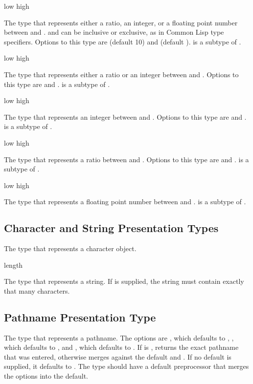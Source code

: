  {\optional low high}

The type that represents either a ratio, an integer, or a floating point number
between  and .   and  can be inclusive or
exclusive, as in Common Lisp type specifiers.  Options to this type are
 (default 10) and  (default ).   is a
subtype of .

 {\optional low high}

The type that represents either a ratio or an integer between  and
.  Options to this type are  and .  
is a subtype of .

 {\optional low high}

The type that represents an integer between  and .  Options
to this type are  and .   is a subtype of
.

 {\optional low high}

The type that represents a ratio between  and .  Options to
this type are  and .   is a subtype of
.

 {\optional low high}

The type that represents a floating point number between  and
.   is a subtype of .


\subsection {Character and String Presentation Types}

 {}

The type that represents a character object.

 {\optional length}

The type that represents a string.  If  is supplied, the string
must contain exactly that many characters.


\subsection {Pathname Presentation Type}

 { }

The type that represents a pathname.  The options are ,
which defaults to , , which defaults to ,
and , which defaults to .  If 
is ,  returns the exact pathname that was entered,
otherwise  merges against the default and .  If
no default is supplied, it defaults to .  The
 type should have a default preprocessor that merges the options
into the default.


